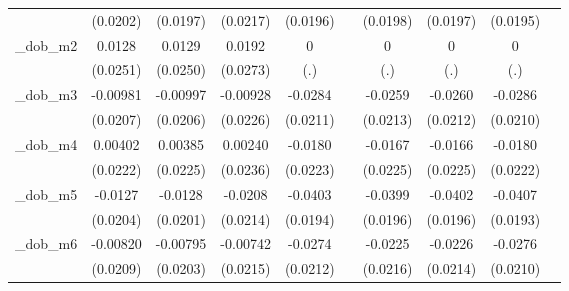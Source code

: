 \begin{table}[htbp]
\begin{tabular}{l*{9}{c}}
            &    (0.0202)         &    (0.0197)         &    (0.0217)         &    (0.0196)         &                     &    (0.0198)         &    (0.0197)         &    (0.0195)         &                     \\
[1em]
\_dob\_m2     &      0.0128         &      0.0129         &      0.0192         &           0         &                     &           0         &           0         &           0         &                     \\
            &    (0.0251)         &    (0.0250)         &    (0.0273)         &         (.)         &                     &         (.)         &         (.)         &         (.)         &                     \\
[1em]
\_dob\_m3     &    -0.00981         &    -0.00997         &    -0.00928         &     -0.0284         &                     &     -0.0259         &     -0.0260         &     -0.0286         &                     \\
            &    (0.0207)         &    (0.0206)         &    (0.0226)         &    (0.0211)         &                     &    (0.0213)         &    (0.0212)         &    (0.0210)         &                     \\
[1em]
\_dob\_m4     &     0.00402         &     0.00385         &     0.00240         &     -0.0180         &                     &     -0.0167         &     -0.0166         &     -0.0180         &                     \\
            &    (0.0222)         &    (0.0225)         &    (0.0236)         &    (0.0223)         &                     &    (0.0225)         &    (0.0225)         &    (0.0222)         &                     \\
[1em]
\_dob\_m5     &     -0.0127         &     -0.0128         &     -0.0208         &     -0.0403\sym{**} &                     &     -0.0399\sym{**} &     -0.0402\sym{**} &     -0.0407\sym{**} &                     \\
            &    (0.0204)         &    (0.0201)         &    (0.0214)         &    (0.0194)         &                     &    (0.0196)         &    (0.0196)         &    (0.0193)         &                     \\
[1em]
\_dob\_m6     &    -0.00820         &    -0.00795         &    -0.00742         &     -0.0274         &                     &     -0.0225         &     -0.0226         &     -0.0276         &                     \\
            &    (0.0209)         &    (0.0203)         &    (0.0215)         &    (0.0212)         &                     &    (0.0216)         &    (0.0214)         &    (0.0210)         &                     \\

\end{tabular}
\end{table}
